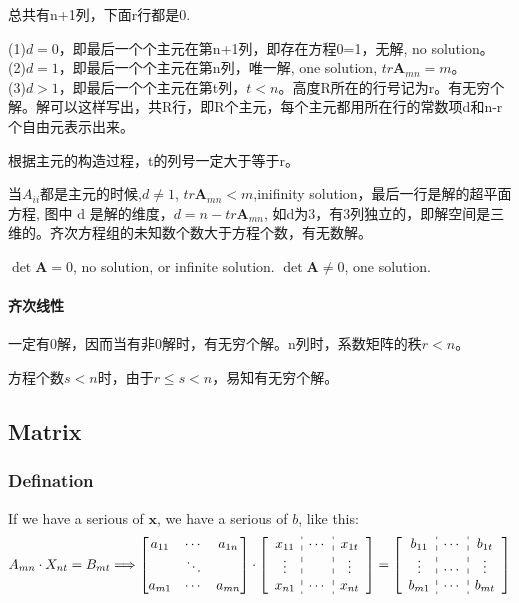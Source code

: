 \documentclass[UTF8]{../../09-Mathematics}
\begin{document}
总共有n+1列，下面r行都是0.

(1)$d = 0$，即最后一个个主元在第n+1列，即存在方程0=1，无解, no solution。\\
(2)$d = 1$，即最后一个个主元在第n列，唯一解, one solution, $tr \boldsymbol A_{mn} = m$。\\
(3)$d > 1$，即最后一个个主元在第t列，$t < n$。高度R所在的行号记为r。有无穷个解。解可以这样写出，共R行，即R个主元，每个主元都用所在行的常数项d和n-r个自由元表示出来。

根据主元的构造过程，t的列号一定大于等于r。


当$A_{ii}$都是主元的时候,$d \neq 1$, $tr \boldsymbol A_{mn} < m$,inifinity solution，最后一行是解的超平面方程, 图中 d 是解的维度，$d =  n -tr \boldsymbol A_{mn}$, 如d为3，有3列独立的，即解空间是三维的。齐次方程组的未知数个数大于方程个数，有无数解。



$\det \boldsymbol A = 0$, no solution, or infinite solution.
$\det \boldsymbol A \neq 0$, one solution.




\paragraph{齐次线性}

一定有0解，因而当有非0解时，有无穷个解。n列时，系数矩阵的秩$r < n$。

方程个数$s < n$时，由于$r  \leqslant s < n$，易知有无穷个解。



\subsection{Matrix}


\subsubsection{Defination}

If we have a serious of $\boldsymbol x$, we have a serious of $b$, like this:
\begin{equation}
  A_{mn} \cdot X_{nt} = B_{mt}
  \Longrightarrow
  \begin{bmatrix}
     a_{11} & \cdots & a_{1n}\\
     & \ddots & \\
     a_{m1} & \cdots & a_{mn} \\
  \end{bmatrix}
  \cdot
  \left[
    \begin{array}{c:c:c}
      x_{11} & \cdots & x_{1t}\\
     \vdots&  & \vdots \\
     x_{n1} & \cdots & x_{nt} \\
    \end{array}
 \right] 
  =
 \left[
    \begin{array}{c:c:c}
      b_{11} & \cdots & b_{1t}\\
      \vdots& \cdots & \vdots \\
      b_{m1} & \cdots & b_{mt} \\
    \end{array}
 \right] 
\end{equation}
\end{document}
